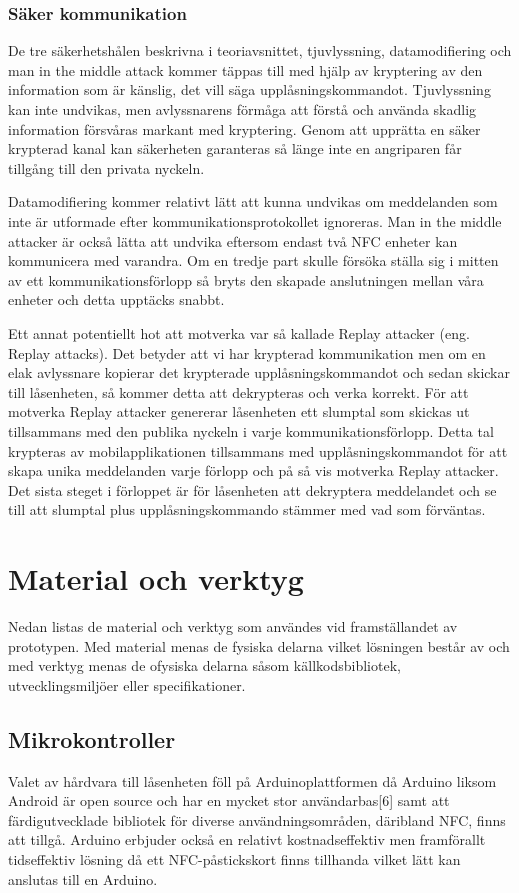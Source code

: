 \documentclass[11pt]{article}
\begin{document}
\subsubsection{Säker kommunikation}
De tre säkerhetshålen beskrivna i teoriavsnittet, tjuvlyssning, datamodifiering och man in the middle attack  kommer täppas till med hjälp av kryptering av den information som är känslig, det vill säga upplåsningskommandot. Tjuvlyssning kan inte undvikas, men avlyssnarens förmåga att förstå och använda skadlig information försvåras markant med kryptering. Genom att upprätta en säker krypterad kanal kan säkerheten garanteras så länge inte en angriparen får tillgång till den privata nyckeln. 

Datamodifiering kommer relativt lätt att kunna undvikas om meddelanden som inte är utformade efter kommunikationsprotokollet ignoreras. Man in the middle attacker är också lätta att undvika eftersom endast två NFC enheter kan kommunicera med varandra. Om en tredje part skulle försöka ställa sig i mitten av ett kommunikationsförlopp så bryts den skapade anslutningen mellan våra enheter och detta upptäcks snabbt. 

Ett annat potentiellt hot att motverka var så kallade Replay attacker (eng. Replay attacks). Det betyder att vi har krypterad kommunikation men om en elak avlyssnare kopierar det krypterade upplåsningskommandot och sedan skickar till låsenheten, så kommer detta att dekrypteras och verka korrekt. För att motverka Replay attacker genererar låsenheten ett slumptal som skickas ut tillsammans med den publika nyckeln i varje kommunikationsförlopp. Detta tal krypteras av mobilapplikationen tillsammans med upplåsningskommandot för att skapa unika meddelanden varje förlopp och på så vis motverka Replay attacker. Det sista steget i förloppet är för låsenheten att dekryptera meddelandet och se till att slumptal plus upplåsningskommando stämmer med vad som förväntas.

\section{Material och verktyg}
Nedan listas de material och verktyg som användes vid framställandet av prototypen. Med material menas de fysiska delarna vilket lösningen består av och med verktyg menas de ofysiska delarna såsom källkodsbibliotek, utvecklingsmiljöer eller specifikationer.

\subsection{Mikrokontroller}
Valet av hårdvara till låsenheten föll på Arduinoplattformen då Arduino liksom Android är open source och har en mycket stor användarbas[6] samt att färdigutvecklade bibliotek för diverse användningsområden, däribland NFC, finns att tillgå. Arduino erbjuder också en relativt kostnadseffektiv men framförallt tidseffektiv lösning då ett NFC-påstickskort finns tillhanda vilket lätt kan anslutas till en Arduino.
\end{document}

